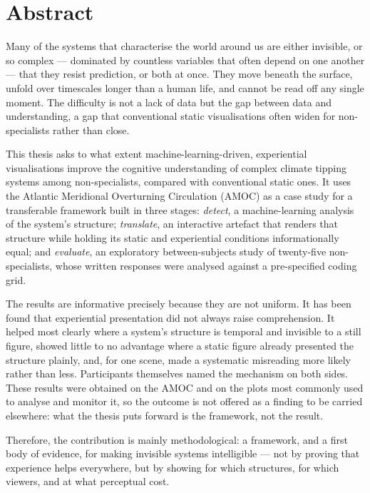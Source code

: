 
\chapter*{Abstract}

Many of the systems that characterise the world around us are either invisible, or so complex --- dominated by countless variables that often depend on one another --- that they resist prediction, or both at once. They move beneath the surface, unfold over timescales longer than a human life, and cannot be read off any single moment. The difficulty is not a lack of data but the gap between data and understanding, a gap that conventional static visualisations often widen for non-specialists rather than close.

This thesis asks to what extent machine-learning-driven, experiential visualisations improve the cognitive understanding of complex climate tipping systems among non-specialists, compared with conventional static ones. It uses the Atlantic Meridional Overturning Circulation (AMOC) as a case study for a transferable framework built in three stages: \emph{detect}, a machine-learning analysis of the system's structure; \emph{translate}, an interactive artefact that renders that structure while holding its static and experiential conditions informationally equal; and \emph{evaluate}, an exploratory between-subjects study of twenty-five non-specialists, whose written responses were analysed against a pre-specified coding grid.

The results are informative precisely because they are not uniform. It has been found that experiential presentation did not always raise comprehension. It helped most clearly where a system's structure is temporal and invisible to a still figure, showed little to no advantage where a static figure already presented the structure plainly, and, for one scene, made a systematic misreading more likely rather than less. Participants themselves named the mechanism on both sides. These results were obtained on the AMOC and on the plots most commonly used to analyse and monitor it, so the outcome is not offered as a finding to be carried elsewhere: what the thesis puts forward is the framework, not the result.

Therefore, the contribution is mainly methodological: a framework, and a first body of evidence, for making invisible systems intelligible --- not by proving that experience helps everywhere, but by showing for which structures, for which viewers, and at what perceptual cost.

\cleardoublepage